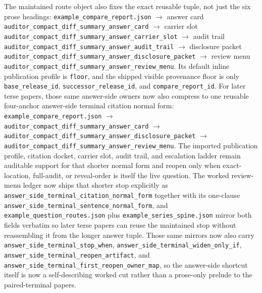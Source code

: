 \documentclass[11pt]{article}
\begin{document}
The maintained route object also fixes the exact reusable tuple, not just the six prose headings:
\texttt{example\_compare\_report.json} $\to$ answer card \texttt{auditor\_compact\_diff\_summary\_answer\_card} $\to$ carrier slot \texttt{auditor\_compact\_diff\_summary\_answer\_carrier\_slot} $\to$ audit trail \texttt{auditor\_compact\_diff\_summary\_answer\_audit\_trail} $\to$ disclosure packet \texttt{auditor\_compact\_diff\_summary\_answer\_disclosure\_packet} $\to$ review menu \texttt{auditor\_compact\_diff\_summary\_answer\_review\_menu}.
Its default inline publication profile is \texttt{floor}, and the shipped visible provenance floor is only \texttt{base\_release\_id}, \texttt{successor\_release\_id}, and \texttt{compare\_report\_id}. For later terse papers, those same answer-side owners now also compress to one reusable four-anchor answer-side terminal citation normal form: \nolinkurl{example_compare_report.json} $\to$ \texttt{auditor\_compact\_diff\_summary\_answer\_card} $\to$ \texttt{auditor\_compact\_diff\_summary\_answer\_disclosure\_packet} $\to$ \texttt{auditor\_compact\_diff\_summary\_answer\_review\_menu}. The imported publication profile, citation docket, carrier slot, audit trail, and escalation ladder remain auditable support for that shorter normal form and reopen only when exact-location, full-audit, or reveal-order is itself the live question. The worked review-menu ledger now ships that shorter stop explicitly as \nolinkurl{answer_side_terminal_citation_normal_form} together with its one-clause \nolinkurl{answer_side_terminal_sentence_normal_form}, and \nolinkurl{example_question_routes.json} plus \nolinkurl{example_series_spine.json} mirror both fields verbatim so later terse papers can reuse the maintained stop without reassembling it from the longer answer tuple. Those same mirrors now also carry \nolinkurl{answer_side_terminal_stop_when}, \nolinkurl{answer_side_terminal_widen_only_if}, \nolinkurl{answer_side_terminal_reopen_artifact}, and \nolinkurl{answer_side_terminal_first_reopen_owner_map}, so the answer-side shortcut itself is now a self-describing worked cut rather than a prose-only prelude to the paired-terminal papers.
\end{document}
